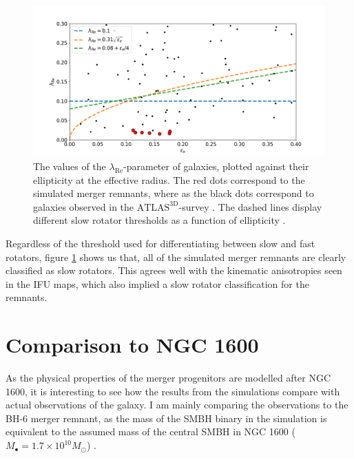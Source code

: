 \documentclass[english, oneside]{HYgradu}
\begin{document}
\begin{figure}[h]
	\centering
	\includegraphics[width=\textwidth]{lambda_epsilon.png}
	\caption{The values of the $\lambda_{\mathrm{Re}}$-parameter of galaxies, plotted against their ellipticity at the effective radius. The red dots correspond to the simulated merger remnants, where as the black dots correspond to galaxies observed in the $\mathrm{ATLAS^{3D}}$-survey \citep{Cappellari2011, Emsellem2011}. The dashed lines display different slow rotator thresholds as a function of ellipticity \citep{Emsellem2007, Emsellem2011, Cappellari2016}.}
	\label{figure:lambda_epsilon}
\end{figure}

Regardless of the threshold used for differentiating between slow and fast rotators, figure \ref{figure:lambda_epsilon} shows us that, all of the simulated merger remnants are clearly classified as slow rotators. This agrees well with the kinematic anisotropies seen in the IFU maps, which also implied a slow rotator classification for the remnants.

\section{Comparison to NGC 1600}

As the physical properties of the merger progenitors are modelled after NGC 1600, it is interesting to see how the results from the simulations compare with actual observations of the galaxy. I am mainly comparing the observations to the BH-6 merger remnant, as the mass of the SMBH binary in the simulation is equivalent to the assumed mass of the central SMBH in NGC 1600 ($M_\bullet = 1.7 \times 10^{10} M_\odot$) \citep{Thomas2016}.
\end{document}

